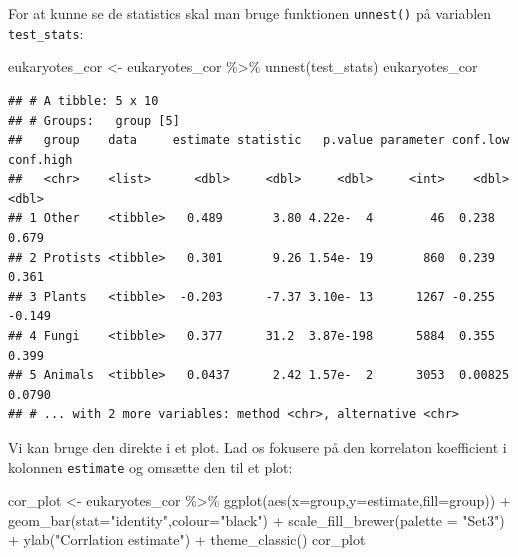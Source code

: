 \documentclass[
]{book}
\newenvironment{Shaded}{\begin{snugshade}}{\end{snugshade}}
\newcommand{\AttributeTok}[1]{\textcolor[rgb]{0.77,0.63,0.00}{#1}}
\newcommand{\FunctionTok}[1]{\textcolor[rgb]{0.00,0.00,0.00}{#1}}
\newcommand{\NormalTok}[1]{#1}
\newcommand{\OtherTok}[1]{\textcolor[rgb]{0.56,0.35,0.01}{#1}}
\newcommand{\SpecialCharTok}[1]{\textcolor[rgb]{0.00,0.00,0.00}{#1}}
\newcommand{\StringTok}[1]{\textcolor[rgb]{0.31,0.60,0.02}{#1}}
\begin{document}
For at kunne se de statistics skal man bruge funktionen \texttt{unnest()} på variablen \texttt{test\_stats}:

\begin{Shaded}
\begin{Highlighting}[]
\NormalTok{eukaryotes\_cor }\OtherTok{\textless{}{-}}\NormalTok{ eukaryotes\_cor }\SpecialCharTok{\%\textgreater{}\%}
  \FunctionTok{unnest}\NormalTok{(test\_stats)}
\NormalTok{eukaryotes\_cor}
\end{Highlighting}
\end{Shaded}

\begin{verbatim}
## # A tibble: 5 x 10
## # Groups:   group [5]
##   group    data     estimate statistic   p.value parameter conf.low conf.high
##   <chr>    <list>      <dbl>     <dbl>     <dbl>     <int>    <dbl>     <dbl>
## 1 Other    <tibble>   0.489       3.80 4.22e-  4        46  0.238      0.679 
## 2 Protists <tibble>   0.301       9.26 1.54e- 19       860  0.239      0.361 
## 3 Plants   <tibble>  -0.203      -7.37 3.10e- 13      1267 -0.255     -0.149 
## 4 Fungi    <tibble>   0.377      31.2  3.87e-198      5884  0.355      0.399 
## 5 Animals  <tibble>   0.0437      2.42 1.57e-  2      3053  0.00825    0.0790
## # ... with 2 more variables: method <chr>, alternative <chr>
\end{verbatim}

Vi kan bruge den direkte i et plot. Lad os fokusere på den korrelaton koefficient i kolonnen \texttt{estimate} og omsætte den til et plot:

\begin{Shaded}
\begin{Highlighting}[]
\NormalTok{cor\_plot }\OtherTok{\textless{}{-}}\NormalTok{ eukaryotes\_cor }\SpecialCharTok{\%\textgreater{}\%}
  \FunctionTok{ggplot}\NormalTok{(}\FunctionTok{aes}\NormalTok{(}\AttributeTok{x=}\NormalTok{group,}\AttributeTok{y=}\NormalTok{estimate,}\AttributeTok{fill=}\NormalTok{group)) }\SpecialCharTok{+} 
  \FunctionTok{geom\_bar}\NormalTok{(}\AttributeTok{stat=}\StringTok{"identity"}\NormalTok{,}\AttributeTok{colour=}\StringTok{"black"}\NormalTok{) }\SpecialCharTok{+}
  \FunctionTok{scale\_fill\_brewer}\NormalTok{(}\AttributeTok{palette =} \StringTok{"Set3"}\NormalTok{) }\SpecialCharTok{+} 
  \FunctionTok{ylab}\NormalTok{(}\StringTok{"Corrlation estimate"}\NormalTok{) }\SpecialCharTok{+}
  \FunctionTok{theme\_classic}\NormalTok{() }
\NormalTok{cor\_plot}
\end{Highlighting}
\end{Shaded}
\end{document}
